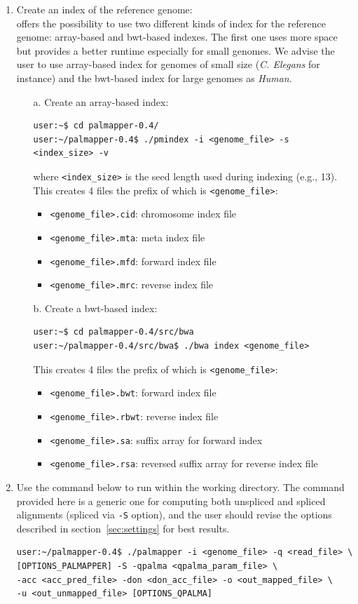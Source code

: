 \documentclass{article}
\begin{document}
\begin{enumerate}
\item Create an index of the reference genome:\\
\PALMapper{} offers the possibility to use two different kinds of
index for the reference genome: array-based and bwt-based indexes. The
first one uses more space but provides a better runtime especially for
small genomes. We advise the user to
use array-based index for genomes of small size (\emph{C. Elegans} for
instance) and the bwt-based index for large genomes as \emph{Human}.
\begin{itemize}
\item[a.] Create an array-based index:
\begin{verbatim}
user:~$ cd palmapper-0.4/
user:~/palmapper-0.4$ ./pmindex -i <genome_file> -s <index_size> -v
\end{verbatim}
where \texttt{<index\_size>} is the seed length used during indexing
(e.g., 13). This creates 4 files the prefix of which is
\texttt{<genome\_file>}:
\begin{itemize}
\item \texttt{<genome\_file>.cid}: chromosome index file
\item \texttt{<genome\_file>.mta}: meta index file
\item \texttt{<genome\_file>.mfd}: forward index file
\item \texttt{<genome\_file>.mrc}: reverse index file
\end{itemize}

\item [b.] Create a bwt-based index:
\begin{verbatim}
user:~$ cd palmapper-0.4/src/bwa
user:~/palmapper-0.4/src/bwa$ ./bwa index <genome_file>
\end{verbatim}
This creates 4 files the prefix of which is \texttt{<genome\_file>}:
\begin{itemize}
\item \texttt{<genome\_file>.bwt}: forward index file
\item \texttt{<genome\_file>.rbwt}: reverse index file
\item \texttt{<genome\_file>.sa}: suffix array for forward index
\item \texttt{<genome\_file>.rsa}: reversed suffix array for reverse
  index file
\end{itemize}
\end{itemize}

\item Use the command below to run \PALMapper{} within the working directory. The
command provided here is a generic one for computing both unspliced and spliced
alignments (spliced via \texttt{-S} option), and the user should
revise the options described in section~\ref{sec:settings} for best results.
\begin{verbatim}
user:~/palmapper-0.4$ ./palmapper -i <genome_file> -q <read_file> \
[OPTIONS_PALMAPPER] -S -qpalma <qpalma_param_file> \
-acc <acc_pred_file> -don <don_acc_file> -o <out_mapped_file> \
-u <out_unmapped_file> [OPTIONS_QPALMA]
\end{verbatim}


\end{enumerate}
\end{document}
